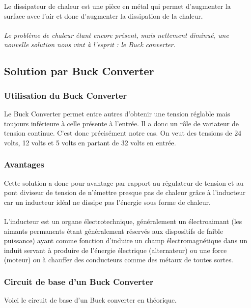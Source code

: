 \documentclass{PackagerQualityN}
\begin{document}

Le dissipateur de chaleur est une pièce en métal qui permet d'augmenter la surface avec l'air et donc d'augmenter la dissipation de la chaleur. 

\paragraph{}
\textit{Le problème de chaleur étant encore présent, mais nettement diminué, une nouvelle solution nous vint à l'esprit : le Buck converter.}








\newpage
\subsection{Solution par Buck Converter}
\subsubsection{Utilisation du Buck Converter}
Le Buck Converter permet entre autres d'obtenir une tension réglable mais toujours inférieure à celle présente à l'entrée. Il a donc un rôle de variateur de tension continue. C'est donc précisément notre cas. On veut des tensions de 24 volts, 12 volts et 5 volts en partant de 32 volts en entrée.

\subsubsection{Avantages}
Cette solution a donc pour avantage par rapport au régulateur de tension et au pont diviseur de tension de n'émettre presque pas de chaleur grâce à l’inducteur car un inducteur idéal ne dissipe pas l’énergie sous forme de chaleur.
\paragraph{}
L'inducteur est un organe électrotechnique, généralement un électroaimant (les aimants permanents étant généralement réservés aux dispositifs de faible puissance) ayant comme fonction d'induire un champ électromagnétique dans un induit servant à produire de l'énergie électrique (alternateur) ou une force (moteur) ou à chauffer des conducteurs comme des métaux de toutes sortes.

\subsubsection{Circuit de base d'un Buck Converter}
Voici le circuit de base d'un Buck converter en théorique.
\newp
\end{document}
